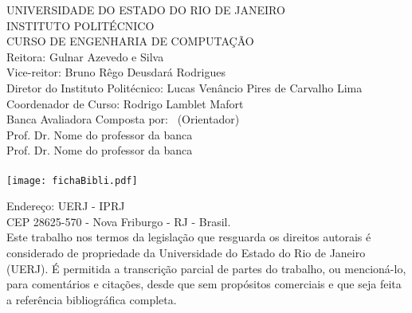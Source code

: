 \newcommand{\imprimircatalogacao}{%
	\noindent
	UNIVERSIDADE DO ESTADO DO RIO DE JANEIRO\\
	INSTITUTO POLITÉCNICO \\ 
    CURSO DE ENGENHARIA DE COMPUTAÇÃO\\
	
    \noindent
	Reitora: Gulnar Azevedo e Silva\\
    Vice-reitor: Bruno Rêgo Deusdará Rodrigues \\
	Diretor do Instituto Politécnico: Lucas Venâncio Pires de Carvalho Lima\\
	Coordenador de Curso: Rodrigo Lamblet Mafort\\
	
	\noindent
	Banca Avaliadora Composta por: \imprimirorientador~(Orientador)\\
	\hspace*{6.3cm}Prof. Dr. Nome do professor da banca\\
	\hspace*{6.3cm}Prof. Dr. Nome do professor da banca
	\\
    \\
   \texttt{[image: fichaBibli.pdf]}

\noindent
Endereço: UERJ - IPRJ \\
\hspace*{2cm} CEP 28625-570 - Nova Friburgo - RJ - Brasil.\\

	\noindent
 Este trabalho nos termos da legislação que resguarda os direitos autorais é considerado de propriedade da Universidade do Estado do Rio de Janeiro (UERJ). É permitida a transcrição parcial de partes do trabalho, ou mencioná-lo, para comentários e citações, desde que sem propósitos comerciais e que seja feita a referência bibliográfica completa.
	\begin{flushright}
		\assinatura{\imprimirautor}
	\end{flushright}
}

\imprimircatalogacao